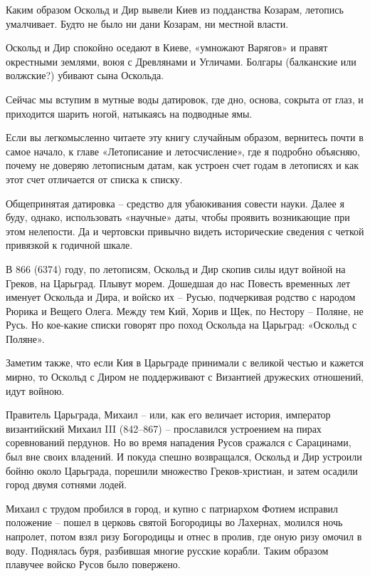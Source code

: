 Каким образом Оскольд и Дир вывели Киев из подданства Козарам, летопись умалчивает. Будто не было ни дани Козарам, ни местной власти.

Оскольд и Дир спокойно оседают в Киеве, «умножают Варягов» и правят окрестными землями, воюя с Древлянами и Угличами. Болгары (балканские или волжские?) убивают сына Оскольда.

Сейчас мы вступим в мутные воды датировок, где дно, основа, сокрыта от глаз, и приходится шарить ногой, натыкаясь на подводные ямы.

Если вы легкомысленно читаете эту книгу случайным образом, вернитесь почти в самое начало, к главе «Летописание и летосчисление», где я подробно объясняю, почему не доверяю летописным датам, как устроен счет годам в летописях и как этот счет отличается от списка к списку.

Общепринятая датировка – средство для убаюкивания совести науки. Далее я буду, однако, использовать «научные» даты, чтобы проявить возникающие при этом нелепости. Да и чертовски привычно видеть исторические сведения с четкой привязкой к годичной шкале.

В 866 (6374) году, по летописям, Оскольд и Дир скопив силы идут войной на Греков, на Царьград. Плывут морем. Дошедшая до нас Повесть временных лет именует Оскольда и Дира, и войско их – Русью, подчеркивая родство с народом Рюрика и Вещего Олега. Между тем Кий, Хорив и Щек, по Нестору – Поляне, не Русь. Но кое-какие списки говорят про поход Оскольда на Царьград: «Оскольд с Поляне».

Заметим также, что если Кия в Царьграде принимали с великой честью и кажется мирно, то Оскольд с Диром не поддерживают с Византией дружеских отношений, идут войною.

Правитель Царьграда, Михаил – или, как его величает история, император византийский Михаил III (842–867) – прославился устроением на пирах соревнований пердунов. Но во время нападения Русов сражался с Сарацинами, был вне своих владений. И покуда спешно возвращался, Оскольд и Дир устроили бойню около Царьграда, порешили множество Греков-христиан, и затем осадили город двумя сотнями лодей.

Михаил с трудом пробился в город, и купно с патриархом Фотием исправил положение – пошел в церковь святой Богородицы во Лахернах, молился ночь напролет, потом взял ризу Богородицы и отнес в пролив, где оную ризу омочил в воду. Поднялась буря, разбившая многие русские корабли. Таким образом плавучее войско Русов было повержено.
 
